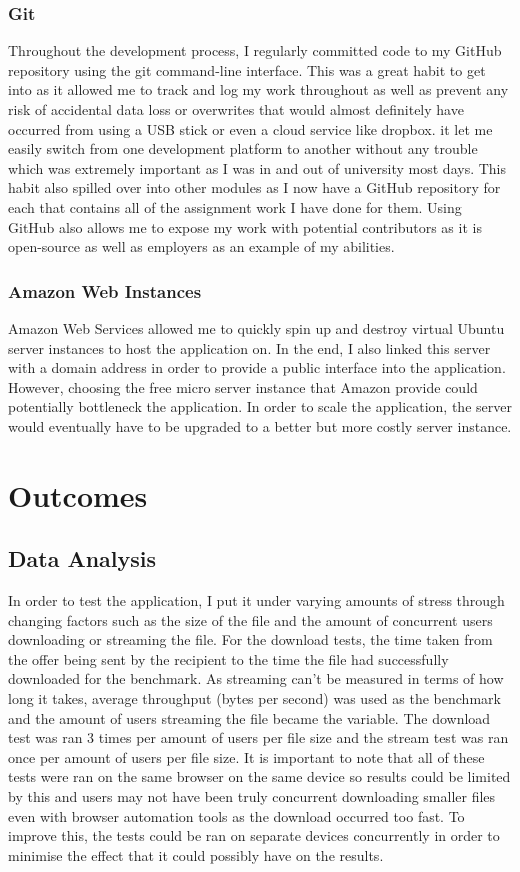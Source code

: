 \documentclass[]{report}
\begin{document}
			\subsection{Git}
			Throughout the development process, I regularly committed code to my GitHub repository using the git command-line interface. This was a great habit to get into as it allowed me to track and log my work throughout as well as prevent any risk of accidental data loss or overwrites that would almost definitely have occurred from using a USB stick or even a cloud service like dropbox. it let me easily switch from one development platform to another without any trouble which was extremely important as I was in and out of university most days. This habit also spilled over into other modules as I now have a GitHub repository for each that contains all of the assignment work I have done for them. Using GitHub also allows me to expose my work with potential contributors as it is open-source as well as employers as an example of my abilities. 
			
			\subsection{Amazon Web Instances}
			Amazon Web Services allowed me to quickly spin up and destroy virtual Ubuntu server instances to host the application on. In the end, I also linked this server with a domain address in order to provide a public interface into the application. However, choosing the free micro server instance that Amazon provide could potentially bottleneck the application. In order to scale the application, the server would eventually have to be upgraded to a better but more costly server instance.
			
	\chapter{Outcomes}
		\section{Data Analysis}
		In order to test the application, I put it under varying amounts of stress through changing factors such as the size of the file and the amount of concurrent users downloading or streaming the file. For the download tests, the time taken from the offer being sent by the recipient to the time the file had successfully downloaded for the benchmark. As streaming can't be measured in terms of how long it takes, average throughput (bytes per second) was used as the benchmark and the amount of users streaming the file became the variable. The download test was ran 3 times per amount of users per file size and the stream test was ran once per amount of users per file size. It is important to note that all of these tests were ran on the same browser on the same device so results could be limited by this and users may not have been truly concurrent downloading smaller files even with browser automation tools as the download occurred too fast. To improve this, the tests could be ran on separate devices concurrently in order to minimise the effect that it could possibly have on the results.
		
\end{document}
